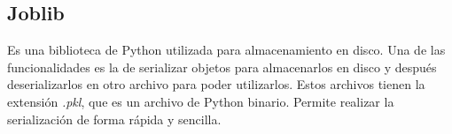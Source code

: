 \subsection{Joblib}
Es una biblioteca de Python utilizada para almacenamiento en disco. Una de las funcionalidades es la de serializar objetos para almacenarlos en disco y después deserializarlos en otro archivo para poder utilizarlos. Estos archivos tienen la extensión \textit{.pkl}, que es un archivo de Python binario. Permite realizar la serialización de forma rápida y sencilla.
